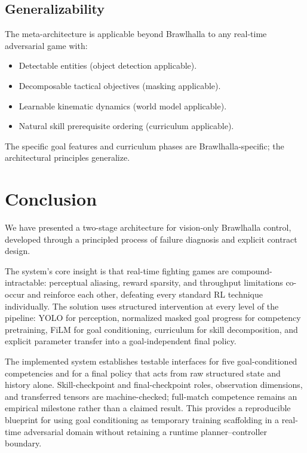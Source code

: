 \documentclass[11pt,a4paper]{article}
\begin{document}
\subsection{Generalizability}

The meta-architecture is applicable beyond Brawlhalla to any real-time adversarial game with:
\begin{itemize}[leftmargin=1.5em]
    \item Detectable entities (object detection applicable).
    \item Decomposable tactical objectives (masking applicable).
    \item Learnable kinematic dynamics (world model applicable).
    \item Natural skill prerequisite ordering (curriculum applicable).
\end{itemize}
The specific goal features and curriculum phases are Brawlhalla-specific; the architectural principles generalize.

\section{Conclusion}
\label{sec:conclusion}

We have presented a two-stage architecture for vision-only Brawlhalla control, developed through a principled process of failure diagnosis and explicit contract design.

The system's core insight is that real-time fighting games are compound-intractable: perceptual aliasing, reward sparsity, and throughput limitations co-occur and reinforce each other, defeating every standard RL technique individually.
The solution uses structured intervention at every level of the pipeline: YOLO for perception, normalized masked goal progress for competency pretraining, FiLM for goal conditioning, curriculum for skill decomposition, and explicit parameter transfer into a goal-independent final policy.

The implemented system establishes testable interfaces for five goal-conditioned competencies and for a final policy that acts from raw structured state and history alone. Skill-checkpoint and final-checkpoint roles, observation dimensions, and transferred tensors are machine-checked; full-match competence remains an empirical milestone rather than a claimed result.
This provides a reproducible blueprint for using goal conditioning as temporary training scaffolding in a real-time adversarial domain without retaining a runtime planner--controller boundary.
\end{document}
